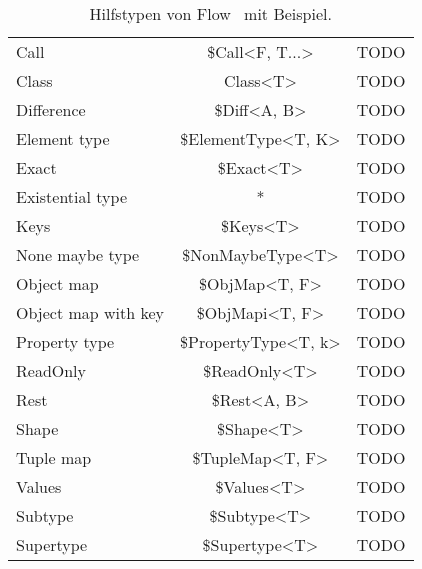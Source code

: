 \begin{longtabuenv}
\begin{longtabu} to 
  \midrule
   &  &  \\
  \midrule
\endhead
  \midrule
  \caption{Hilfstypen von Flow~\autocite{FLOW:UTILITY_TYPES} mit Beispiel.}
\endfoot
  Call                & \$Call<F, T...>        & TODO   \medskip\\
  Class               & Class<T>               & TODO   \medskip\\
  Difference          & \$Diff<A, B>           & TODO   \medskip\\
  Element type        & \$ElementType<T, K>    & TODO   \medskip\\
  Exact               & \$Exact<T>             & TODO   \medskip\\
  Existential type    & *                      & TODO   \medskip\\
  Keys                & \$Keys<T>              & TODO   \medskip\\
  None maybe type     & \$NonMaybeType<T>      & TODO   \medskip\\
  Object map          & \$ObjMap<T, F>         & TODO   \medskip\\
  Object map with key & \$ObjMapi<T, F>        & TODO   \medskip\\
  Property type       & \$PropertyType<T, k>   & TODO   \medskip\\
  ReadOnly            & \$ReadOnly<T>          & TODO   \medskip\\
  Rest                & \$Rest<A, B>           & TODO   \medskip\\
  Shape               & \$Shape<T>             & TODO   \medskip\\
  Tuple map           & \$TupleMap<T, F>       & TODO   \medskip\\
  Values              & \$Values<T>            & TODO   \medskip\\
  Subtype             & \$Subtype<T>           & TODO   \medskip\\
  Supertype           & \$Supertype<T>         & TODO   \medskip
  \label{tab:flow-utility-types}
\end{longtabu}
\end{longtabuenv}
